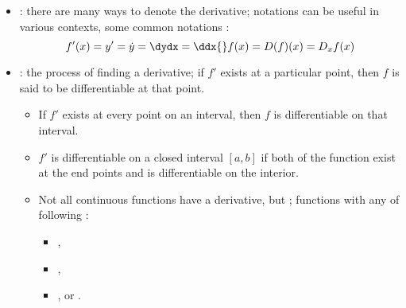 \begin{itemize}
\begin{itemize}
    \item {}: there are many ways to denote the derivative; notations can be useful in various contexts, some common notations :
    \[%
      f'(x) = y' = \dot{y} = \dydx = \ddx{} f(x) = D(f)(x) = D_x f(x)
    \]%
    
    \item {}: the process of finding a derivative; if \(f'\) exists at a particular point, then \(f\) is said to be differentiable at that point. 
      \begin{itemize}
        \item If \(f'\) exists at every point on an interval, then \(f\) is differentiable on that interval.
        \item \(f'\) is differentiable on a closed interval \([a,b]\) if both \hyperref[ss: One-Sided Limit]{} of the function  exist at the end points  and is differentiable on the interior. 
        \item Not all continuous functions have a derivative, but ; functions with any of following :
          \begin{itemize}
            \item {} , 
            \item {} ,
            \item {}, or . 
          \end{itemize}
      \end{itemize}
  \end{itemize}

\end{itemize}

